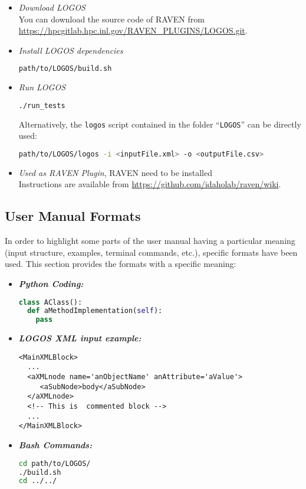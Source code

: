 \begin{itemize}
  \item \textit{Download LOGOS}
    \\ You can download the source code of RAVEN from \url{https://hpcgitlab.hpc.inl.gov/RAVEN_PLUGINS/LOGOS.git}.
  \item \textit{Install LOGOS dependencies}
	\begin{lstlisting}[language=bash]
	path/to/LOGOS/build.sh
	\end{lstlisting}
  \item \textit{Run LOGOS}
	\begin{lstlisting}[language=bash]
	./run_tests
	\end{lstlisting}
  	Alternatively, the \texttt{logos} script
    contained in the folder ``\texttt{LOGOS}'' can be directly used:
\begin{lstlisting}[language=bash]
path/to/LOGOS/logos -i <inputFile.xml> -o <outputFile.csv>
\end{lstlisting}
	\item \textit{Used as RAVEN Plugin}, RAVEN need to be installed
		\\ Instructions are available from \url{https://github.com/idaholab/raven/wiki}.
\end{itemize}

\subsection{User Manual Formats}
In order to highlight some parts of the user manual having a particular meaning
(input structure, examples, terminal commands, etc.), specific formats have been used.
This section provides the formats with a specific meaning:
\begin{itemize}
\item \textbf{\textit{Python Coding:}}
\begin{lstlisting}[language=python]
class AClass():
  def aMethodImplementation(self):
    pass
\end{lstlisting}
\item \textbf{\textit{LOGOS XML input example:}}
\begin{lstlisting}[style=XML,morekeywords={anAttribute}]
<MainXMLBlock>
  ...
  <aXMLnode name='anObjectName' anAttribute='aValue'>
     <aSubNode>body</aSubNode>
  </aXMLnode>
  <!-- This is  commented block -->
  ...
</MainXMLBlock>
\end{lstlisting}
\item \textbf{\textit{Bash Commands:}}
\begin{lstlisting}[language=bash]
cd path/to/LOGOS/
./build.sh
cd ../../
\end{lstlisting}
\end{itemize}

